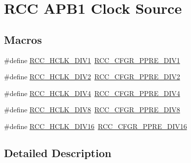 \hypertarget{group___r_c_c___a_p_b1___clock___source}{}\section{R\+CC A\+P\+B1 Clock Source}
\label{group___r_c_c___a_p_b1___clock___source}
\subsection*{Macros}
\begin{DoxyCompactItemize}
\item 
\#define \hyperlink{group___r_c_c___a_p_b1___clock___source_ga8e3fcdef0e5d77bb61a52420fe1e9fbc}{R\+C\+C\+\_\+\+H\+C\+L\+K\+\_\+\+D\+I\+V1}~\hyperlink{group___peripheral___registers___bits___definition_ga96b327debdecc8d7cb1348bffa10f449}{R\+C\+C\+\_\+\+C\+F\+G\+R\+\_\+\+P\+P\+R\+E\+\_\+\+D\+I\+V1}
\item 
\#define \hyperlink{group___r_c_c___a_p_b1___clock___source_ga4d2ebcf280d85e8449a5fb7b994b5169}{R\+C\+C\+\_\+\+H\+C\+L\+K\+\_\+\+D\+I\+V2}~\hyperlink{group___peripheral___registers___bits___definition_ga291734798fe9cc096b93d0798562a888}{R\+C\+C\+\_\+\+C\+F\+G\+R\+\_\+\+P\+P\+R\+E\+\_\+\+D\+I\+V2}
\item 
\#define \hyperlink{group___r_c_c___a_p_b1___clock___source_ga85b5f4fd936e22a3f4df5ed756f6e083}{R\+C\+C\+\_\+\+H\+C\+L\+K\+\_\+\+D\+I\+V4}~\hyperlink{group___peripheral___registers___bits___definition_gab6669f4d4c82666c4d36e9ee381af3f7}{R\+C\+C\+\_\+\+C\+F\+G\+R\+\_\+\+P\+P\+R\+E\+\_\+\+D\+I\+V4}
\item 
\#define \hyperlink{group___r_c_c___a_p_b1___clock___source_gadb18bc60e2c639cb59244bedb54f7bb3}{R\+C\+C\+\_\+\+H\+C\+L\+K\+\_\+\+D\+I\+V8}~\hyperlink{group___peripheral___registers___bits___definition_gaf392829682cb0d80bbccbced1ffb95f2}{R\+C\+C\+\_\+\+C\+F\+G\+R\+\_\+\+P\+P\+R\+E\+\_\+\+D\+I\+V8}
\item 
\#define \hyperlink{group___r_c_c___a_p_b1___clock___source_ga27ac27d48360121bc2dc68b99dc8845d}{R\+C\+C\+\_\+\+H\+C\+L\+K\+\_\+\+D\+I\+V16}~\hyperlink{group___peripheral___registers___bits___definition_ga7b8c69e27ab07c9a7219d2c746616ab2}{R\+C\+C\+\_\+\+C\+F\+G\+R\+\_\+\+P\+P\+R\+E\+\_\+\+D\+I\+V16}
\end{DoxyCompactItemize}


\subsection{Detailed Description}


